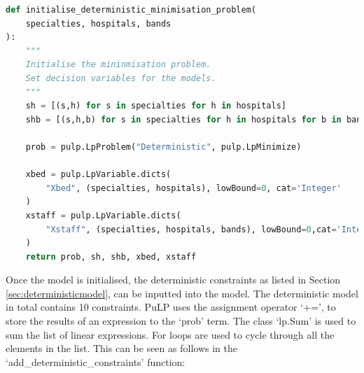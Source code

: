 \documentclass[../thesis.tex]{subfiles}
\begin{document}
\begin{lstlisting}[language = python]
def initialise_deterministic_minimisation_problem(
    specialties, hospitals, bands
):
    """
    Initialise the mininmisation problem. 
    Set decision variables for the models.
    """
    sh = [(s,h) for s in specialties for h in hospitals]
    shb = [(s,h,b) for s in specialties for h in hospitals for b in bands]

    prob = pulp.LpProblem("Deterministic", pulp.LpMinimize)
    
    xbed = pulp.LpVariable.dicts(
        "Xbed", (specialties, hospitals), lowBound=0, cat='Integer'
    )
    xstaff = pulp.LpVariable.dicts(
        "Xstaff", (specialties, hospitals, bands), lowBound=0,cat='Integer'
    )
    return prob, sh, shb, xbed, xstaff
\end{lstlisting}
Once the model is initialised, the deterministic constraints as listed in Section \ref{sec:deterministicmodel}, can be inputted into the model. The deterministic model in total contains 10 constraints. PuLP uses the assignment operator `+=', to store the results of an expression to the `prob' term. The class `lp.Sum' is used to sum the list of linear expressions. For loops are used to cycle through all the elements in the list. This can be seen as follows in the `add\_deterministic\_constraints' function:
\end{document}
